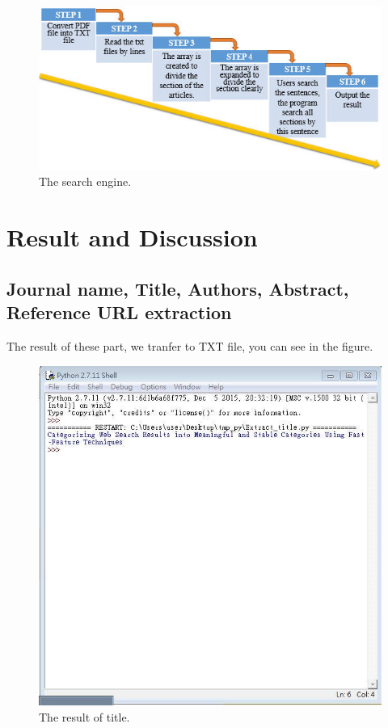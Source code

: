 \begin{figure}[tbh]
	\begin{center}
		\includegraphics[width=\columnwidth]{Union_Method_Chart_Search engine}
	\end{center}
	\caption{The search engine.}
	\end{figure}
	
\section*{Result and Discussion}
	\subsection*{Journal name, Title, Authors, Abstract, Reference URL extraction}
	The result of these part, we tranfer to TXT file, you can see in the figure.

	\begin{figure}[tbh]
		\begin{center}
			\includegraphics[width=\columnwidth]{Union_Result_Chart_Title}
		\end{center}
		\caption{The result of title.}
	\end{figure}
	
